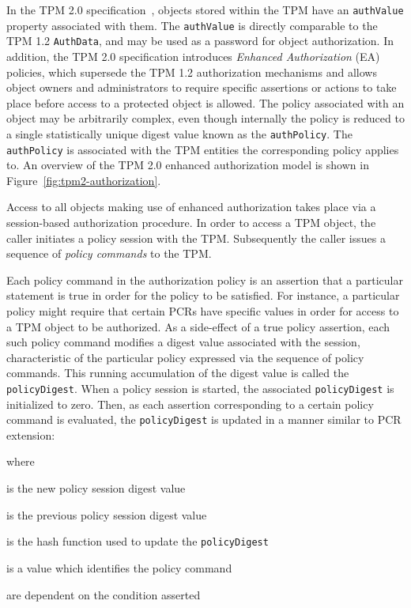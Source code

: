 \documentclass{sig-alternate-2013}
\begin{document}
In the TPM 2.0 specification~\cite{TPM2.0}, objects stored within the TPM have
an \texttt{authValue} property associated with them. The \texttt{authValue} is
directly comparable to the TPM 1.2 \texttt{AuthData}, and may be used as a
password for object authorization. In addition, the TPM 2.0 specification
introduces \emph{Enhanced Authorization} (EA) policies, which supersede the TPM
1.2 authorization mechanisms and allows object owners and administrators to
require specific assertions or actions to take place before access to a
protected object is allowed. The policy associated with an object may be
arbitrarily complex, even though internally the policy is reduced to a single
statistically unique digest value known as the \texttt{authPolicy}. The
\texttt{authPolicy} is associated with the TPM entities the corresponding policy
applies to. An overview of the TPM 2.0 enhanced authorization model is shown in
Figure~\ref{fig:tpm2-authorization}.

Access to all objects making use of enhanced authorization takes place via a
session-based authorization procedure. In order to access a TPM object, the
caller initiates a policy session with the TPM\@. Subsequently the caller issues
a sequence of \emph{policy commands} to the TPM.

Each policy command in the authorization policy is an assertion that a
particular statement is true in order for the policy to be satisfied. For
instance, a particular policy might require that certain PCRs have specific
values in order for access to a TPM object to be authorized. As a side-effect of
a true policy assertion, each such policy command modifies a digest value
associated with the session, characteristic of the particular policy expressed
via the sequence of policy commands. This running accumulation of the digest
value is called the \texttt{policyDigest}.  When a policy session is started,
the associated \texttt{policyDigest} is initialized to zero. Then, as each
assertion corresponding to a certain policy command is evaluated, the
\texttt{policyDigest} is updated in a manner similar to PCR extension:

\vspace{.5\baselineskip}
\noindent
{}

\vspace{.5\baselineskip}
\noindent where

\begin{description}
  \small
  \item[$policyDigest_{new}$] \hfill is the new policy session digest value
  \item[$policyDigest_{old}$] \hfill is the previous policy session digest value
  \item[$\mathbf{H}()$]       \hfill is the hash function used to update the \texttt{policyDigest}
  \item[$commandCode$]        \hfill is a value which identifies the policy command
  \item[$commandArgs$]        \hfill are dependent on the condition asserted
\end{description}
\end{document}
